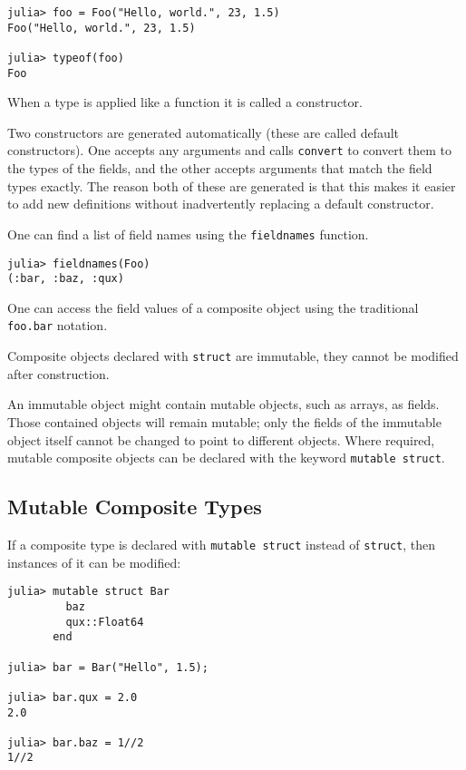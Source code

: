 \documentclass[
]{article}
\begin{document}
\begin{verbatim}
julia> foo = Foo("Hello, world.", 23, 1.5)
Foo("Hello, world.", 23, 1.5)

julia> typeof(foo)
Foo
\end{verbatim}

When a type is applied like a function it is called a constructor.

Two constructors are generated automatically (these are called default
constructors). One accepts any arguments and calls \texttt{convert} to
convert them to the types of the fields, and the other accepts arguments
that match the field types exactly. The reason both of these are
generated is that this makes it easier to add new definitions without
inadvertently replacing a default constructor.

One can find a list of field names using the \texttt{fieldnames}
function.

\begin{verbatim}
julia> fieldnames(Foo)
(:bar, :baz, :qux)
\end{verbatim}

One can access the field values of a composite object using the
traditional \texttt{foo.bar} notation.

Composite objects declared with \texttt{struct} are immutable, they
cannot be modified after construction.

An immutable object might contain mutable objects, such as arrays, as
fields. Those contained objects will remain mutable; only the fields of
the immutable object itself cannot be changed to point to different
objects. Where required, mutable composite objects can be declared with
the keyword \texttt{mutable\ struct}.

\hypertarget{mutable-composite-types}{%
\subsection{Mutable Composite Types}\label{mutable-composite-types}}

If a composite type is declared with \texttt{mutable\ struct} instead of
\texttt{struct}, then instances of it can be modified:

\begin{verbatim}
julia> mutable struct Bar
         baz
         qux::Float64
       end

julia> bar = Bar("Hello", 1.5);

julia> bar.qux = 2.0
2.0

julia> bar.baz = 1//2
1//2
\end{verbatim}
\end{document}

